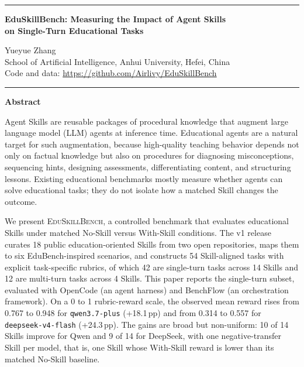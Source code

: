 \documentclass[10pt]{article}
\newcommand{\bench}{\textsc{EduSkillBench}\xspace}
\newcommand{\ppgain}[1]{+#1\,pp}
\begin{document}
\thispagestyle{empty}

\noindent\rule{\textwidth}{3.3pt}
\vspace{0.45em}

\begin{center}
{\bfseries\fontsize{18pt}{20.5pt}\selectfont
EduSkillBench: Measuring the Impact of Agent Skills\\[2pt]
on Single-Turn Educational Tasks}
\vspace{0.55em}

{\normalsize Yueyue Zhang}\\[-1pt]
{\small School of Artificial Intelligence, Anhui University, Hefei, China}\\[-1pt]
{\small Code and data: \url{https://github.com/Airlivy/EduSkillBench}}
\end{center}

\vspace{0.35em}
\noindent\rule{\textwidth}{0.65pt}

\vspace{0.7em}
\begin{center}
{\bfseries Abstract}
\end{center}
\vspace{-0.35em}

Agent Skills are reusable packages of procedural knowledge that augment large language model (LLM) agents at inference time. Educational agents are a natural target for such augmentation, because high-quality teaching behavior depends not only on factual knowledge but also on procedures for diagnosing misconceptions, sequencing hints, designing assessments, differentiating content, and structuring lessons. Existing educational benchmarks mostly measure whether agents can solve educational tasks; they do not isolate how a matched Skill changes the outcome.

We present \bench, a controlled benchmark that evaluates educational Skills under matched No-Skill versus With-Skill conditions. The v1 release curates 18 public education-oriented Skills from two open repositories, maps them to six EduBench-inspired scenarios, and constructs 54 Skill-aligned tasks with explicit task-specific rubrics, of which 42 are single-turn tasks across 14 Skills and 12 are multi-turn tasks across 4 Skills. This paper reports the single-turn subset, evaluated with OpenCode (an agent harness) and BenchFlow (an orchestration framework). On a 0 to 1 rubric-reward scale, the observed mean reward rises from 0.767 to 0.948 for \texttt{qwen3.7-plus} (\ppgain{18.1}) and from 0.314 to 0.557 for \texttt{deepseek-v4-flash} (\ppgain{24.3}). The gains are broad but non-uniform: 10 of 14 Skills improve for Qwen and 9 of 14 for DeepSeek, with one negative-transfer Skill per model, that is, one Skill whose With-Skill reward is lower than its matched No-Skill baseline.
\end{document}
